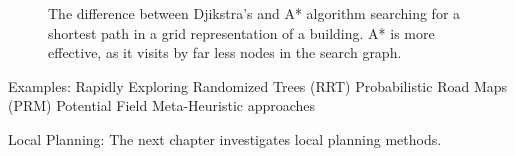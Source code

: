 \begin{figure}[thpb]
	  \myfloatalign
      \footnotesize
      \centering
    
   \caption[Djikstra's and A* algorithm.]{The difference between Djikstra's and A* algorithm searching for a shortest path in a grid representation of a building. A* is more effective, as it visits by far less nodes in the search graph. }
\label{fig:fig_overview}
\end{figure}
Examples: 
Rapidly Exploring Randomized Trees (RRT)
Probabilistic Road Maps (PRM)
Potential Field
Meta-Heuristic approaches

Local Planning:
The next chapter investigates local planning methods.





